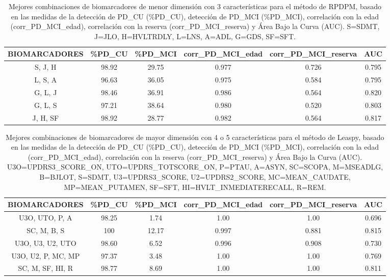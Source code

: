 \begin{table}[H]
	\centering
	\begin{adjustbox}{max width=\textwidth}
		\begin{tabular}{|c|c|c|c|c|c|}
			\hline
			\textbf{BIOMARCADORES} & \textbf{\%PD\_CU} & \textbf{\%PD\_MCI} & \textbf{corr\_PD\_MCI\_edad} & \textbf{corr\_PD\_MCI\_reserva} & \textbf{AUC} \\ \hline
			S, J, H  & 98.92 & 29.75 & 0.977 & 0.726 & 0.795 \\ \hline
			L, S, A & 96.63 & 36.05 & 0.975 & 0.584 & 0.795 \\
			\hline
			G, L, J & 98.46 & 36.91 & 0.986 & 0.564 & 0.820 \\
			\hline
			G, L, S & 97.21 & 38.64 & 0.980 & 0.520 & 0.803 \\ \hline
			J, H, SF & 98.92 & 28.77 & 0.982 & 0.564 & 0.817 \\   \hline
		\end{tabular}
	\end{adjustbox}
	\caption{Mejores combinaciones de biomarcadores de menor dimensión con 3 características para el método de RPDPM, basado en las medidas de la detección de PD\_CU (\%PD\_CU), detección de PD\_MCI (\%PD\_MCI), correlación con la edad (corr\_PD\_MCI\_edad), correlación con la reserva (corr\_PD\_MCI\_reserva) y Área Bajo la Curva (AUC). S=SDMT, J=JLO, H=HVLTRDLY, L=LNS, A=ADL, G=GDS, SF=SFT.}
	\label{tab:RPDPM3}
\end{table}


\begin{table}[H]
	\centering
	\begin{adjustbox}{max width=\textwidth}
		\begin{tabular}{|c|c|c|c|c|c|}
			\hline
			\textbf{BIOMARCADORES} & \textbf{\%PD\_CU} & \textbf{\%PD\_MCI} & \textbf{corr\_PD\_MCI\_edad} & \textbf{corr\_PD\_MCI\_reserva} & \textbf{AUC} \\ \hline
			 U3O, UTO, P, A & 98.25 & 1.74 & 1.00 & 1.00 & 0.696\\ \hline
			 SC, M, B, S & 100 & 12.17 & 0.997 & 0.881 & 0.815\\ \hline
			 U3O, U3, U2, UTO & 98.60 & 6.52 & 0.996 & 0.908 & 0.730 \\ \hline
			 U3O, U2, P, MC, MP  & 97.37 & 3.48 & 1.00 & 1.00 & 0.769\\ \hline
			 SC, M, SF, HI, R & 98.77 & 8.69 & 1.00 & 1.00 & 0.811\\ \hline
		\end{tabular}
	\end{adjustbox}	
	\caption{Mejores combinaciones de biomarcadores de mayor dimensión con 4 o 5 características para el método de Leaspy, basado en las medidas de la detección de PD\_CU (\%PD\_CU), detección de PD\_MCI (\%PD\_MCI), correlación con la edad (corr\_PD\_MCI\_edad), correlación con la reserva (corr\_PD\_MCI\_reserva) y Área Bajo la Curva (AUC). U3O=UPDRS3\_SCORE\_ON, UTO=UPDRS\_TOTSCORE\_ON, P=PTAU, A=ASYN, SC=SCOPA, M=MSEADLG, B=BJLOT, S=SDMT, U3=UPDRS3\_SCORE, U2=UPDRS2\_SCORE, MC=MEAN\_CAUDATE, MP=MEAN\_PUTAMEN, SF=SFT, HI=HVLT\_INMEDIATERECALL, R=REM.}
	\label{tab:LEASPY4y5}
\end{table}



